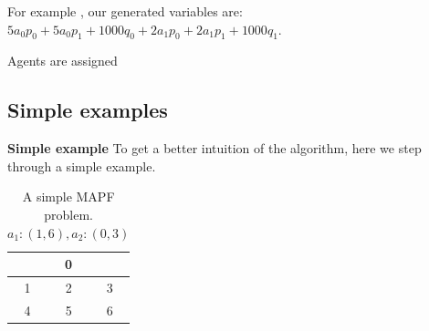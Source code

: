 \documentclass[a4paper,11pt]{article}
\begin{document}
For example \cite{put example!}, our generated variables are: $5a_0p_0 + 5a_0p_1 + 1000q_0 + 2a_1p_0 + 2a_1p_1 + 1000q_1$.

Agents are assigned


\subsection{Simple examples}
\noindent \textbf{Simple example} To get a better intuition of the algorithm, here we step through a simple example.

\begin{table}[h]
	\centering
	\footnotesize
	\begin{tabular}{|c|c|c|}
		\hline
		\cellcolor{black} & 0 & \cellcolor{black} \\ \hline
		1 & 2 & 3 \\ \hline
		4 & 5 & 6 \\ \hline
	\end{tabular}
	
	\caption{A simple MAPF problem. $a_1: (1, 6), a_2: (0, 3)$}
	\label{fig:simple-step-through-example}
\end{table}
\end{document}
